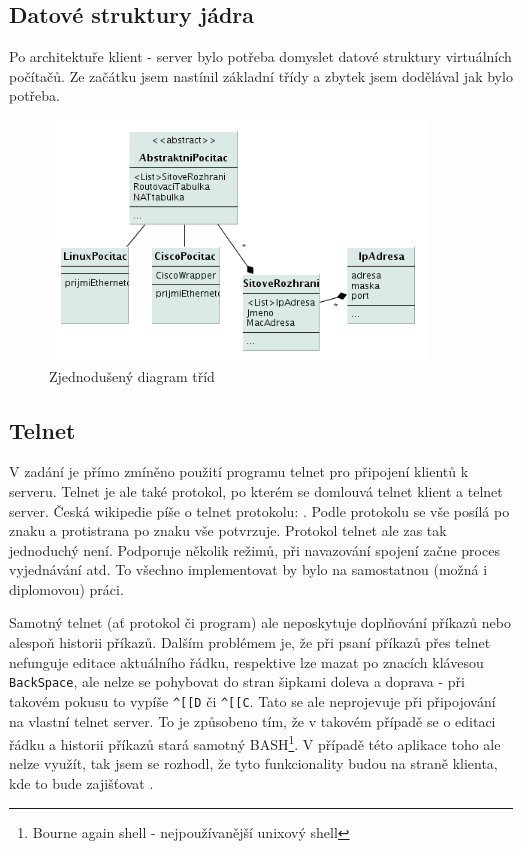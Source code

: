 \newpage

\subsection{Datové struktury jádra}

Po architektuře klient - server bylo potřeba domyslet datové struktury virtuálních počítačů. Ze začátku jsem nastínil základní třídy a zbytek jsem dodělával jak bylo potřeba. 


\begin{figure}[h]
\begin{center}
\includegraphics[width=10cm]{figures/uml_class}
\caption{Zjednodušený diagram tříd}
\label{fig:class}
\end{center}
\end{figure}

\subsection{Telnet}
V zadání je přímo zmíněno použití programu telnet pro připojení klientů k serveru. Telnet je ale také protokol, po kterém se domlouvá telnet klient a telnet server. Česká wikipedie píše o telnet protokolu: . Podle protokolu se vše posílá po znaku a protistrana po znaku vše potvrzuje. Protokol telnet ale zas tak jednoduchý není. Podporuje několik režimů, při navazování spojení začne proces vyjednávání atd. To všechno implementovat by bylo na samostatnou (možná i diplomovou) práci. 

Samotný telnet (ať protokol či program) ale neposkytuje doplňování příkazů nebo alespoň historii příkazů. Dalším problémem je, že při psaní příkazů přes telnet nefunguje editace aktuálního řádku, respektive lze mazat po znacích klávesou \verb|BackSpace|, ale nelze se pohybovat do stran šipkami doleva a doprava - při takovém pokusu to vypíše \verb|^[[D| či \verb|^[[C|. Tato  se ale neprojevuje při připojování na vlastní telnet server. To je způsobeno tím, že v takovém případě se o editaci řádku a historii příkazů stará samotný BASH\footnote{Bourne again shell - nejpoužívanější unixový shell}. V případě této aplikace toho ale nelze využít, tak jsem se rozhodl, že tyto funkcionality budou na straně klienta, kde to bude zajišťovat . 

